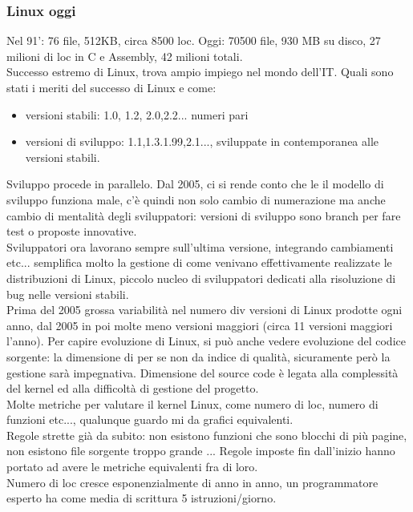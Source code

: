 \documentclass[12pt, oneside]{extbook}
\begin{document}
\subsubsection{Linux oggi}
Nel 91': 76 file, 512KB, circa 8500 loc. Oggi: 70500 file, 930 MB su disco, 27 milioni di loc in C e Assembly, 42 milioni totali.\\ Successo estremo di Linux, trova ampio impiego nel mondo dell'IT. Quali sono stati i meriti del successo di Linux e come:
\begin{itemize}
\item versioni stabili: 1.0, 1.2, 2.0,2.2... numeri pari
\item  versioni di sviluppo: 1.1,1.3.1.99,2.1..., sviluppate in contemporanea alle versioni stabili.
\end{itemize}
Sviluppo procede in parallelo. Dal 2005, ci si rende conto che le il modello di sviluppo funziona male, c'è quindi non solo cambio di numerazione ma anche cambio di mentalità degli sviluppatori: versioni di sviluppo sono branch per fare test o proposte innovative.\\ Sviluppatori ora lavorano sempre sull'ultima versione, integrando cambiamenti etc... semplifica molto la gestione di come venivano effettivamente realizzate le distribuzioni di Linux, piccolo nucleo di sviluppatori dedicati alla risoluzione di bug nelle versioni stabili.\\ Prima del 2005 grossa variabilità nel numero div versioni di Linux prodotte ogni anno, dal 2005 in poi molte meno versioni maggiori (circa 11 versioni maggiori l'anno). Per capire evoluzione di Linux, si può anche vedere evoluzione del codice sorgente: la dimensione di per se non da indice di qualità, sicuramente però la gestione sarà impegnativa. Dimensione del source code è legata alla complessità del kernel ed alla difficoltà di gestione del progetto.\\ Molte metriche per valutare il kernel Linux, come numero di loc, numero di funzioni etc..., qualunque guardo mi da grafici equivalenti.\\ Regole strette già da subito: non esistono funzioni che sono blocchi di più pagine, non esistono file sorgente troppo grande ... Regole imposte fin dall'inizio hanno portato ad avere le metriche equivalenti fra di loro.\\ Numero di loc cresce esponenzialmente di anno in anno, un programmatore esperto ha come media di scrittura 5 istruzioni/giorno.
\end{document}
